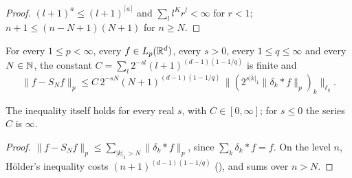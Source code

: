 \begin{proof}
\leanok
$(l + 1)^a \leq (l + 1)^{\lceil a \rceil}$ and $\sum_l l^K r^l < \infty$ for $r < 1$;
$n + 1 \leq (n - N + 1)(N + 1)$ for $n \geq N$.
\end{proof}

\begin{theorem}
\label{thm:hyperbolic-cross}
\leanok
{}
For every $1 \leq p < \infty$, every $f \in L_p(\mathbb{R}^d)$, every $s > 0$, every
$1 \leq q \leq \infty$ and every $N \in \mathbb{N}$, the constant
$C = \sum_l 2^{-sl} (l + 1)^{(d-1)(1 - 1/q)}$ is finite and
\[
  \|f - S_N f\|_p \leq C \, 2^{-sN} (N + 1)^{(d-1)(1 - 1/q)} \,
    \|(2^{s|k|_1} \|\delta_k * f\|_p)_k\|_{\ell_q} .
\]
\end{theorem}

The inequality itself holds for every real $s$, with $C \in [0, \infty]$; for $s \leq 0$ the
series $C$ is $\infty$.

\begin{proof}
\leanok
$\|f - S_N f\|_p \leq \sum_{|k|_1 > N} \|\delta_k * f\|_p$, since $\sum_k \delta_k * f = f$. On the
level $n$, Hölder's inequality costs $(n + 1)^{(d-1)(1 - 1/q)}$ (), and
 sums over $n > N$.
\end{proof}
